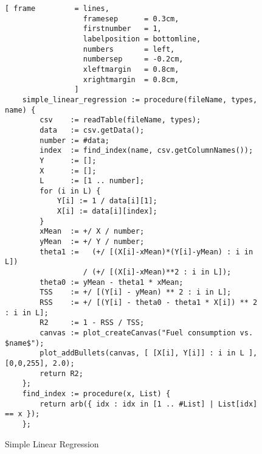 \begin{figure}[!ht]
\centering
\begin{Verbatim}[ frame         = lines, 
                  framesep      = 0.3cm, 
                  firstnumber   = 1,
                  labelposition = bottomline,
                  numbers       = left,
                  numbersep     = -0.2cm,
                  xleftmargin   = 0.8cm,
                  xrightmargin  = 0.8cm,
                ]
    simple_linear_regression := procedure(fileName, types, name) {
        csv    := readTable(fileName, types);
        data   := csv.getData();
        number := #data;
        index  := find_index(name, csv.getColumnNames());
        Y      := [];
        X      := [];
        L      := [1 .. number];
        for (i in L) {
            Y[i] := 1 / data[i][1];
            X[i] := data[i][index];
        }
        xMean  := +/ X / number;
        yMean  := +/ Y / number;
        theta1 :=   (+/ [(X[i]-xMean)*(Y[i]-yMean) : i in L]) 
                  / (+/ [(X[i]-xMean)**2 : i in L]);
        theta0 := yMean - theta1 * xMean;
        TSS    := +/ [(Y[i] - yMean) ** 2 : i in L];
        RSS    := +/ [(Y[i] - theta0 - theta1 * X[i]) ** 2 : i in L];
        R2     := 1 - RSS / TSS;
        canvas := plot_createCanvas("Fuel consumption vs. $name$");
        plot_addBullets(canvas, [ [X[i], Y[i]] : i in L ], [0,0,255], 2.0);
        return R2;
    };
    find_index := procedure(x, List) {
        return arb({ idx : idx in [1 .. #List] | List[idx] == x });
    };
\end{Verbatim}
\vspace*{-0.3cm}
\caption{Simple Linear Regression}
\label{fig:simple-linear-regression.stlx}
\end{figure}


